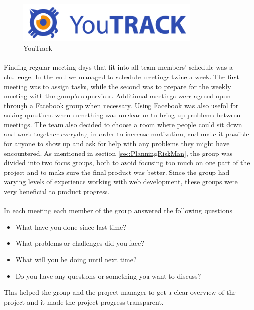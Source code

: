 \begin{figure}[ht!]
\centering
\includegraphics[width=90mm]{./Planning/img/YouTrack_logo}
\caption{YouTrack \label{fig:PlanningQualityRoutinesYouTrack}}
\end{figure}

\paragraph{} Finding regular meeting days that fit into all team members' schedule was a challenge. In the end we managed to schedule meetings twice a week. The first meeting was to assign tasks, while the second was to prepare for the weekly meeting with the group's supervisor. Additional meetings were agreed upon through a Facebook group when necessary. Using Facebook was also usefol for asking questions when something was unclear or to bring up problems between meetings. The team also decided to choose a room where people could sit down and work together everyday, in order to increase motivation, and make it possible for anyone to show up and ask for help with any problems they might have encountered. As mentioned in section \ref{sec:PlanningRiskMan}, the group was divided into two focus groups, both to avoid focusing too much on one part of the project and to make sure the final product was better. Since the group had varying levels of experience working with web development, these groups were very beneficial to product progress.

\paragraph{} In each meeting each member of the group answered the following questions:
\begin{itemize}
  \item What have you done since last time?
  \item What problems or challenges did you face?
  \item What will you be doing until next time?
  \item Do you have any questions or something you want to discuss?
\end{itemize}
This helped the group and the project manager to get a clear overview of the project and it made the project progress transparent.

